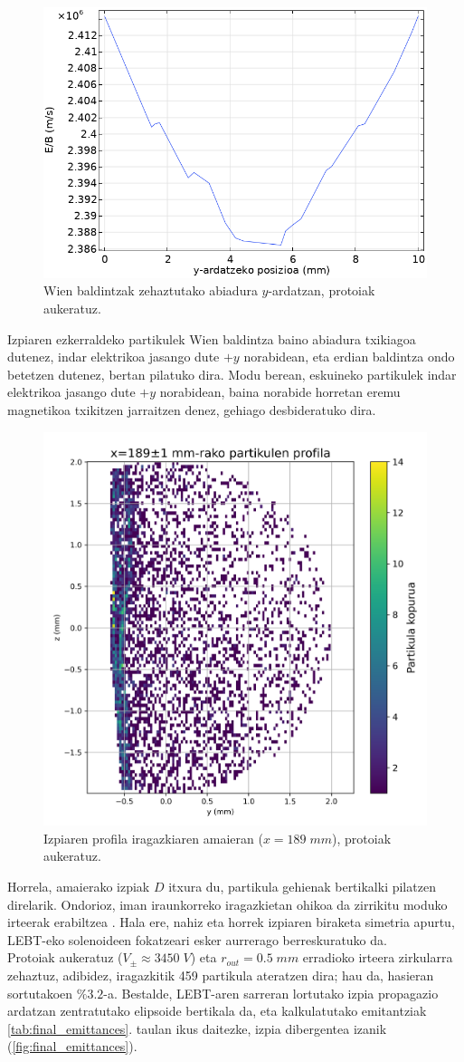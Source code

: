 \documentclass[12pt]{article}
\numberwithin{figure}{section}
\numberwithin{equation}{section}
\begin{document}
\begin{figure}[h]
    \centering
    \includegraphics[width=0.5\linewidth]{4 - Diseinua/wien_baldintza.png}
    \caption{Wien baldintzak zehaztutako abiadura $y$-ardatzan, protoiak aukeratuz.}
    \label{fig:wien_baldintza}
\end{figure}

Izpiaren ezkerraldeko partikulek Wien baldintza baino abiadura txikiagoa dutenez, indar elektrikoa jasango dute $+y$ norabidean, eta erdian baldintza ondo betetzen dutenez, bertan pilatuko dira. Modu berean, eskuineko partikulek indar elektrikoa jasango dute $+y$ norabidean, baina norabide horretan eremu magnetikoa txikitzen jarraitzen denez, gehiago desbideratuko dira.

\begin{figure}[h]
    \centering
    \includegraphics[width=0.4\linewidth]{4 - Diseinua/wien_final_profile.png}
    \caption{Izpiaren profila iragazkiaren amaieran ($x=189\;mm$), protoiak aukeratuz.}
    \label{fig:wien_profile}
\end{figure}

Horrela, amaierako izpiak $D$ itxura du, partikula gehienak bertikalki pilatzen direlarik. Ondorioz, iman iraunkorreko iragazkietan ohikoa da zirrikitu moduko irteerak erabiltzea \cite{zhang_new_2004}. Hala ere, nahiz eta horrek izpiaren biraketa simetria apurtu, LEBT-eko solenoideen fokatzeari esker aurrerago berreskuratuko da. \\

Protoiak aukeratuz ($V_\pm \approx 3450\;V$) eta $r_{out}=\num{0.5}\;mm$ erradioko irteera zirkularra zehaztuz, adibidez, iragazkitik 459 partikula ateratzen dira; hau da, hasieran sortutakoen $\%\num{3.2}$-a. Bestalde, LEBT-aren sarreran lortutako izpia propagazio ardatzan zentratutako elipsoide bertikala da, eta kalkulatutako emitantziak \ref{tab:final_emittances}. taulan ikus daitezke, izpia dibergentea izanik (\ref{fig:final_emittances}).
\end{document}
